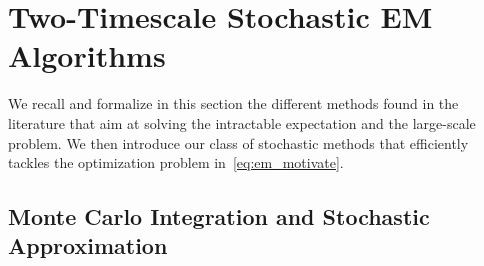 \documentclass[12pt]{article}
\begin{document}
\section{Two-Timescale Stochastic EM Algorithms}\label{sec:tts}


We recall and formalize in this section the different methods found in the literature that aim at solving the intractable expectation and the large-scale problem. 
We then introduce our class of stochastic methods that efficiently tackles the optimization problem in~\eqref{eq:em_motivate}.


\subsection{Monte Carlo Integration and Stochastic Approximation} 
\end{document}
